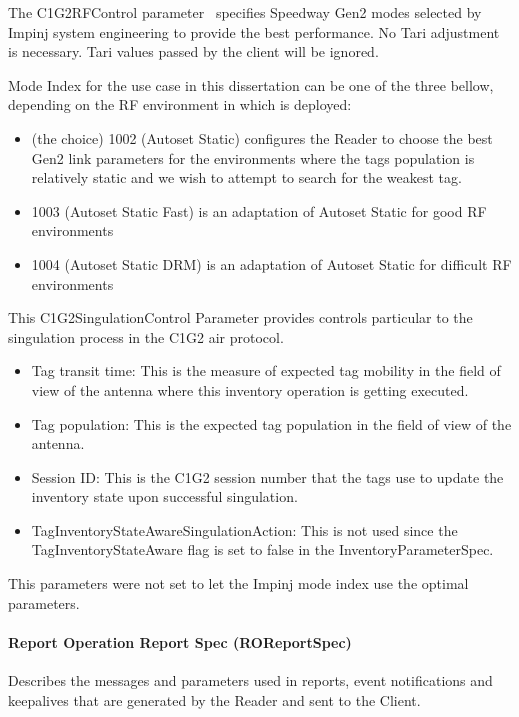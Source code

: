 The C1G2RFControl parameter~\cite[sec. 3.1.4]{ImpinjOctaneLLRP} specifies Speedway Gen2 modes selected by Impinj system engineering to provide the best performance. No Tari adjustment is necessary. Tari values passed by the client will be ignored.

Mode Index for the use case in this dissertation can be one of the three bellow, depending on the RF environment in which is deployed: 

\begin{itemize}
    \item (the choice) 1002 (Autoset Static) configures the Reader to choose the best Gen2 link parameters for the environments where the tags population is relatively static and we wish to attempt to search for the weakest tag.
    \item 1003 (Autoset Static Fast) is an adaptation of Autoset Static for good RF environments
    \item 1004 (Autoset Static DRM) is an adaptation of Autoset Static for difficult RF environments
\end{itemize}

This C1G2SingulationControl Parameter provides controls particular to the singulation process in the C1G2 air protocol.

\begin{itemize}
    \item Tag transit time: This is the measure of expected tag mobility in the field of view of the antenna where this inventory operation is getting executed.
    \item Tag population: This is the expected tag population in the field of view of the antenna.
    \item Session ID: This is the C1G2 session number that the tags use to update the inventory state upon successful singulation.
    \item  TagInventoryStateAwareSingulationAction: This is not used since the TagInventoryStateAware flag is set to false in the InventoryParameterSpec.
\end{itemize}

This parameters were not set to let the Impinj mode index use the optimal parameters.

\paragraph{Report Operation Report Spec (ROReportSpec)}

Describes the messages and parameters used in reports, event notifications and keepalives that are generated by the Reader and sent to the Client.

